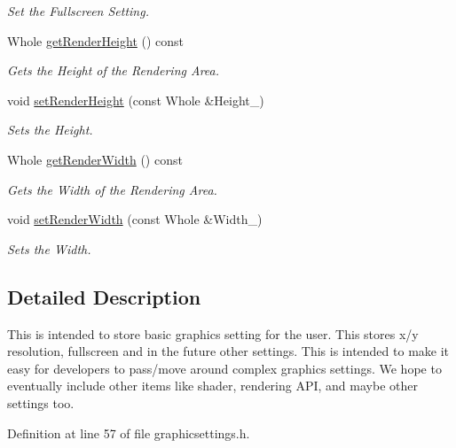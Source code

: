 \begin{DoxyCompactItemize}
\begin{DoxyCompactList}\small\item\em Set the Fullscreen Setting. \item\end{DoxyCompactList}\item 
Whole \hyperlink{classphys_1_1GraphicsSettings_a118171db4fc0a2b17da4284cc91fbeb4}{getRenderHeight} () const 
\begin{DoxyCompactList}\small\item\em Gets the Height of the Rendering Area. \item\end{DoxyCompactList}\item 
void \hyperlink{classphys_1_1GraphicsSettings_a1e6b11740f681beb4d64553656a760f1}{setRenderHeight} (const Whole \&Height\_\-)
\begin{DoxyCompactList}\small\item\em Sets the Height. \item\end{DoxyCompactList}\item 
Whole \hyperlink{classphys_1_1GraphicsSettings_aa8a8548afca8d3e127a1be69a2c1eba2}{getRenderWidth} () const 
\begin{DoxyCompactList}\small\item\em Gets the Width of the Rendering Area. \item\end{DoxyCompactList}\item 
void \hyperlink{classphys_1_1GraphicsSettings_a7cebb39f829f5e600231b4efc22b9ec3}{setRenderWidth} (const Whole \&Width\_\-)
\begin{DoxyCompactList}\small\item\em Sets the Width. \item\end{DoxyCompactList}\end{DoxyCompactItemize}


\subsection{Detailed Description}
This is intended to store basic graphics setting for the user. This stores x/y resolution, fullscreen and in the future other settings. This is intended to make it easy for developers to pass/move around complex graphics settings. We hope to eventually include other items like shader, rendering API, and maybe other settings too. 

Definition at line 57 of file graphicsettings.h.



